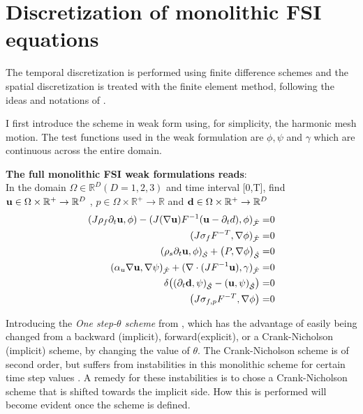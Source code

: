 \section{Discretization of monolithic FSI equations}\label{Discretization}
The temporal discretization is performed using finite difference schemes and the spatial discretization is treated with the finite element method, following the ideas and notations of \cite{Wick2011}.

I first introduce the scheme in weak form using, for simplicity, the harmonic mesh motion. The test functions used in the weak formulation are $\phi, \psi$ and $\gamma$ which are continuous across the entire domain.

\textbf{The full monolithic FSI weak formulations reads}:\\
In the domain $\Omega \in \mathbb{R}^D (D=1,2,3)$ and time interval [0,T],
find $\bold{u} \in \Omega \times \mathbb{R}^+ \rightarrow \mathbb{R}^D$ , $ p \in \Omega \times \mathbb{R}^+ \rightarrow \mathbb{R}$ and $\bold{d} \in \Omega \times \mathbb{R}^+ \rightarrow \mathbb{R}^D$
\begin{align}
   (J \rho_f \partial_t \bold{u} , \phi ) - (J (\nabla \bold{u})F^{-1}(\bold{u} - \partial_t d) , \phi )_{\mathcal{\hat{F}}} =& 0 \label{eq:firsweak} \\
   ( J \sigma_{f} F^{-T} , \nabla \phi )_{\mathcal{\hat{F}}} =& 0\\
   (\rho_s \partial_t \bold{u} , \phi)_{\mathcal{\hat{S}}}   + \big(P, \nabla \phi \big)_{\mathcal{\hat{S}}} =& 0\\
   ( \alpha_u \nabla \bold{u}, \nabla \psi)_{\mathcal{\hat{F}}} + (\nabla \cdot (J F^{-1} \bold{u}),\gamma )_{\mathcal{\hat{F}}} =& 0\\
    \delta\big((\partial_t \bold{d} , \psi)_{\mathcal{\hat{S}}}  - ( \bold{u} , \psi )_{\mathcal{\hat{S}}}\big)=&0       \label{eq:condition} \\ 
    \big( J \sigma_{f,p} F^{-T}, \nabla \phi  \big) =& 0 \label{eq:weak} 	 		
\end{align}

Introducing the \textit{One step-$\theta$ scheme} from \cite{Wick2011}, which has the advantage of easily being changed from a backward (implicit), forward(explicit), or a Crank-Nicholson (implicit) scheme, by changing the value of $\theta$. The Crank-Nicholson scheme is of second order, but suffers from instabilities in this monolithic scheme for certain time step values \cite{Wick2011}. A remedy for these instabilities is to chose a Crank-Nicholson scheme that is shifted towards the implicit side. How this is performed will become evident once the scheme is defined.

